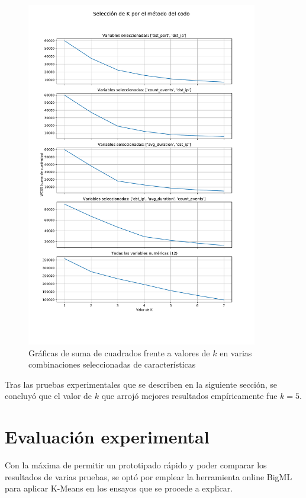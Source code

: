 \begin{figure}[h!]
    \centering
    \captionsetup{width=0.75\textwidth}
    \includegraphics[width=0.9\textwidth]{contenido/fig/codo.pdf}
    \caption{Gráficas de suma de cuadrados frente a valores de $k$ en varias combinaciones seleccionadas de características}
    \label{fig:codo}
\end{figure}

Tras las pruebas experimentales que se describen en la siguiente sección, se concluyó que el valor de $k$ que arrojó mejores resultados empíricamente fue $k=5$.

\section{Evaluación experimental}\label{sec:evaluacionexperimental}

Con la máxima de permitir un prototipado rápido y poder comparar los resultados de varias pruebas,
se optó por emplear la herramienta online BigML para aplicar K-Means en los ensayos que se procede a explicar.

